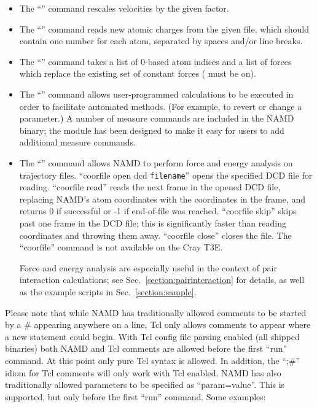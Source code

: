 \begin{itemize}
 \item The ``'' command rescales velocities by
    the given factor.
 \item The ``'' command reads new atomic charges from
    the given file, which should contain one number for each atom, separated
    by spaces and/or line breaks.
 \item The ``'' command takes a list of
    0-based atom indices and a list of forces which replace the existing
    set of constant forces ( must be on).
 \item The ``'' command allows user-programmed calculations to
    be executed in order to facilitate automated methods.  (For
    example, to revert or change a parameter.)  A number of measure
    commands are included in the NAMD binary; the module has been designed
    to make it easy for users to add additional measure commands.  
 \item The ``'' command allows NAMD to perform force and energy
    analysis on trajectory files.  ``coorfile open dcd {\tt filename}'' opens
    the specified DCD file for reading.  ``coorfile read'' reads the next
    frame in the opened DCD file, replacing NAMD's atom coordinates with the
    coordinates in the frame, and returns 0 if successful or -1 if  
    end-of-file was reached.  ``coorfile skip'' skips past one frame in the
    DCD file; this is significantly faster than reading coordinates and 
    throwing them away.  ``coorfile close'' closes the file.   
    The ``coorfile'' command is not available on the Cray T3E.

    Force and energy analysis are especially useful in the context of 
    pair interaction calculations; see Sec.~\ref{section:pairinteraction}
    for details, as well as the example scripts in Sec.~\ref{section:sample}.
\end{itemize}

Please note that while NAMD has traditionally allowed comments to be
started by a \# appearing anywhere on a line, Tcl only allows comments
to appear where a new statement could begin.  With Tcl config file
parsing enabled (all shipped binaries) both NAMD and Tcl comments are
allowed before the first ``run'' command.  At this point only pure Tcl
syntax is allowed.  In addition, the ``;\#'' idiom for Tcl comments will
only work with Tcl enabled.  NAMD has also traditionally allowed
parameters to be specified as ``param=value''.  This is supported, but
only before the first ``run'' command.  Some examples:

